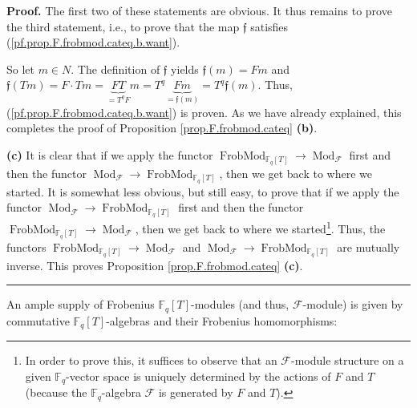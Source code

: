 \documentclass[numbers=enddot,12pt,final,onecolumn,notitlepage]{scrartcl}%
\theoremstyle{definition}
\newenvironment{proof}[1][Proof]{\noindent\textbf{#1.} }{\ \rule{0.5em}{0.5em}}
\begin{document}
\begin{proof}
The first two of these statements are obvious. It thus remains to prove the
third statement, i.e., to prove that the map $\mathfrak{f}$ satisfies
(\ref{pf.prop.F.frobmod.cateq.b.want}).

So let $m\in N$. The definition of $\mathfrak{f}$ yields $\mathfrak{f}\left(
m\right)  =Fm$ and $\mathfrak{f}\left(  Tm\right)  =F\cdot Tm=\underbrace{FT}%
_{=T^{q}F}m=T^{q}\underbrace{Fm}_{=\mathfrak{f}\left(  m\right)  }%
=T^{q}\mathfrak{f}\left(  m\right)  $. Thus,
(\ref{pf.prop.F.frobmod.cateq.b.want}) is proven. As we have already
explained, this completes the proof of Proposition \ref{prop.F.frobmod.cateq}
\textbf{(b)}.

\textbf{(c)} It is clear that if we apply the functor $\operatorname*{FrobMod}%
\nolimits_{\mathbb{F}_{q}\left[  T\right]  }\rightarrow\operatorname*{Mod}%
\nolimits_{\mathcal{F}}$ first and then the functor $\operatorname*{Mod}%
\nolimits_{\mathcal{F}}\rightarrow\operatorname*{FrobMod}\nolimits_{\mathbb{F}%
_{q}\left[  T\right]  }$, then we get back to where we started. It is somewhat
less obvious, but still easy, to prove that if we apply the functor
$\operatorname*{Mod}\nolimits_{\mathcal{F}}\rightarrow\operatorname*{FrobMod}%
\nolimits_{\mathbb{F}_{q}\left[  T\right]  }$ first and then the functor
$\operatorname*{FrobMod}\nolimits_{\mathbb{F}_{q}\left[  T\right]
}\rightarrow\operatorname*{Mod}\nolimits_{\mathcal{F}}$, then we get back to
where we started\footnote{In order to prove this, it suffices to observe that
an $\mathcal{F}$-module structure on a given $\mathbb{F}_{q}$-vector space is
uniquely determined by the actions of $F$ and $T$ (because the $\mathbb{F}%
_{q}$-algebra $\mathcal{F}$ is generated by $F$ and $T$).}. Thus, the functors
$\operatorname*{FrobMod}\nolimits_{\mathbb{F}_{q}\left[  T\right]
}\rightarrow\operatorname*{Mod}\nolimits_{\mathcal{F}}$ and
$\operatorname*{Mod}\nolimits_{\mathcal{F}}\rightarrow\operatorname*{FrobMod}%
\nolimits_{\mathbb{F}_{q}\left[  T\right]  }$ are mutually inverse. This
proves Proposition \ref{prop.F.frobmod.cateq} \textbf{(c)}.
\end{proof}

An ample supply of Frobenius $\mathbb{F}_{q}\left[  T\right]  $-modules (and
thus, $\mathcal{F}$-module) is given by commutative $\mathbb{F}_{q}\left[
T\right]  $-algebras and their Frobenius homomorphisms:
\end{document}
